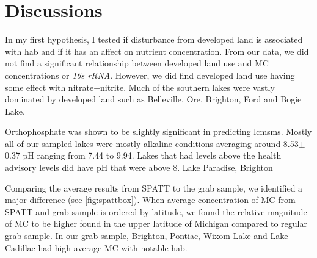 \section{Discussions}


In my first hypothesis, I tested if disturbance from developed land is associated with \gls{hab} and if it has an affect on nutrient concentration.  From our data, we did not find a significant relationship between developed land use and MC concentrations or \emph{16s rRNA}. However, we did find developed land use having some effect with nitrate+nitrite. 
Much of the southern lakes were vastly dominated by developed land such as Belleville, Ore, Brighton, Ford and Bogie Lake. 


Orthophosphate was shown to be slightly significant in predicting \gls{lcmsms}. 
Mostly all of our sampled lakes were mostly alkaline conditions averaging around 8.53$\pm$0.37 pH ranging from 7.44 to 9.94. Lakes that had levels above the health advisory levels did have pH that were above 8. Lake Paradise, Brighton %



Comparing the average results from SPATT to the grab sample, we identified a major difference (see \ref{fig:spattbox}). When average concentration of MC from SPATT and grab sample is ordered by latitude, we found the relative magnitude of MC to be higher found in the upper latitude of Michigan compared to regular grab sample. In our grab sample, Brighton, Pontiac, Wixom Lake and Lake Cadillac had high average MC with notable \gls{hab}.

